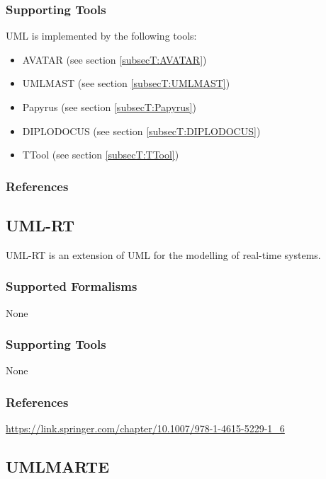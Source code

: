 \subsubsection{Supporting Tools}

UML is implemented by the following tools:
\begin{itemize}
	\item AVATAR (see section \ref{subsecT:AVATAR})
	\item UMLMAST (see section \ref{subsecT:UMLMAST})
	\item Papyrus (see section \ref{subsecT:Papyrus})
	\item DIPLODOCUS (see section \ref{subsecT:DIPLODOCUS})
	\item TTool (see section \ref{subsecT:TTool})
\end{itemize}


\subsubsection{References}





\subsection{UML-RT}
\label{subsecL:UML-RT}


UML-RT is an extension of UML for the modelling of real-time systems.

\subsubsection{Supported Formalisms}

None


\subsubsection{Supporting Tools}

None


\subsubsection{References}
\url{https://link.springer.com/chapter/10.1007/978-1-4615-5229-1_6}




\subsection{UMLMARTE}
\label{subsecL:UMLMARTE}

